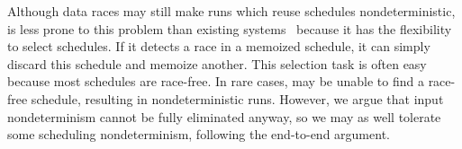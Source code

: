 
Although data races may still make runs which reuse schedules nondeterministic,
\tern is less prone to this problem than existing \dmt
systems~\cite{kendo:asplos09} because it has the flexibility to select
schedules.  If it detects a race in a memoized schedule, it can simply
discard this schedule and memoize another.  This selection task is often
easy because most schedules are race-free.  In rare cases, \tern may be
unable to find a race-free schedule, resulting in nondeterministic runs.
However, we argue that input nondeterminism cannot be fully eliminated
anyway, so we may as well tolerate some scheduling nondeterminism,
following the end-to-end argument.




